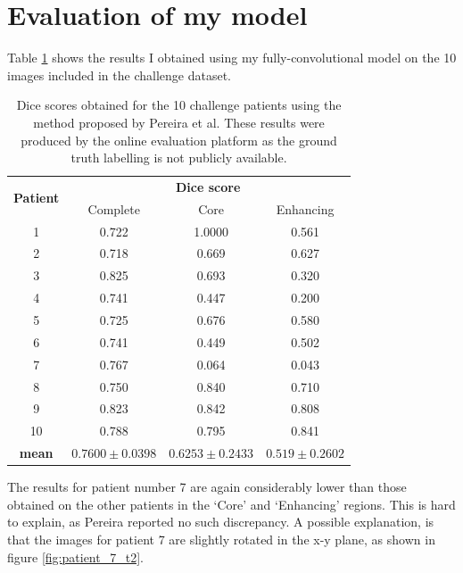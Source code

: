 \documentclass[12pt,a4paper,twoside,openright]{report}
\begin{document}
\section{Evaluation of my model}
Table \ref{table:my_model_dice_results} shows the results I obtained using my fully-convolutional model on the 10 images included in the challenge dataset.
\begin{table}[h]
\centering	
\label{table:my_model_dice_results}
\begin{tabular}{ c | c c c} 
\multirow{2}{*}{\textbf{Patient}} & \multicolumn{3}{c}{\textbf{Dice score}} \\
 & Complete & Core & Enhancing \\
 \hline
1 &	0.722 & 1.0000 & 0.561\\
2 & 0.718 & 0.669 & 0.627 \\
3 & 0.825 & 0.693 & 0.320 \\
4 & 0.741 & 0.447 & 0.200 \\
5 & 0.725 & 0.676 & 0.580 \\
6 & 0.741 & 0.449 & 0.502 \\
7 & 0.767 & 0.064 & 0.043 \\
8 & 0.750 & 0.840 & 0.710 \\
9 & 0.823 & 0.842 & 0.808 \\
10 & 0.788 & 0.795 & 0.841 \\
\hline
\rule{0pt}{3ex}    
\textbf{mean} & $0.7600 \pm 0.0398$ & 	$0.6253 \pm 0.2433$ & $0.519  \pm 0.2602$ \\
\end{tabular}
\caption{Dice scores obtained for the 10 challenge patients using the method proposed by Pereira et al. These results were produced by the online evaluation platform as the ground truth labelling is not publicly available.}
\end{table}

The results for patient number 7 are again considerably lower than those obtained on the other patients in the `Core' and `Enhancing' regions. This is hard to explain, as Pereira reported no such discrepancy. A possible explanation, is that the images for patient 7 are slightly rotated in the x-y plane, as shown in figure \ref{fig:patient_7_t2}.
\end{document}
